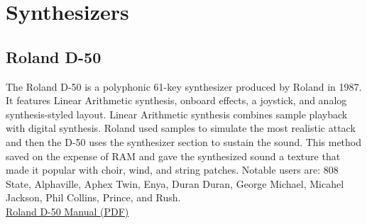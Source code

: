 \documentclass{tufte-book} %
\begin{document}
%
%
%
%
%

\section{Synthesizers}

\subsection{Roland D-50}
\begin{fullwidth}
The Roland D-50 is a polyphonic 61-key synthesizer produced by Roland in 1987. It features Linear Arithmetic synthesis, onboard effects, a joystick, and analog synthesis-styled layout. Linear Arithmetic synthesis combines sample playback with digital synthesis. Roland used samples to simulate the most realistic attack and then the D-50 uses the synthesizer section to sustain the sound. This method saved on the expense of RAM and gave the synthesized sound a texture that made it popular with choir, wind, and string patches. Notable users are: 808 State, Alphaville, Aphex Twin, Enya, Duran Duran, George Michael, Micahel Jackson, Phil Collins, Prince, and Rush. \\
\linebreak
\href{https://github.com/dkadyrov/MIDILab/blob/master/Manuals/Roland_D50.pdf}{Roland D-50 Manual (PDF)}
\end{fullwidth}
\end{document}
